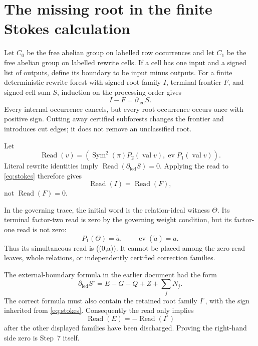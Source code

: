 \documentclass[11pt]{article}
\theoremstyle{definition}
\theoremstyle{remark}
\newcommand{\Sym}{\operatorname{Sym}}
\newcommand{\ev}{\operatorname{ev}}
\begin{document}
\section{The missing root in the finite Stokes calculation}

Let \(C_0\) be the free abelian group on labelled row occurrences and let
\(C_1\) be the free abelian group on labelled rewrite cells.  If a cell has
one input and a signed list of outputs, define its boundary to be input
minus outputs.  For a finite deterministic rewrite forest with signed root
family \(I\), terminal frontier \(F\), and signed cell sum \(S\), induction
on the processing order gives
\begin{equation}
                         I-F=\partial_{\mathrm{led}}S.       \label{eq:stokes}
\end{equation}
Every internal occurrence cancels, but every root occurrence occurs once
with positive sign.  Cutting away certified subforests changes the frontier
and introduces cut edges; it does not remove an unclassified root.

Let
\[
 \operatorname{Read}(v)=
 \left(
  \Sym^2(\pi)P_2(\operatorname{val}v),
  \ev P_1(\operatorname{val}v)
 \right).
\]
Literal rewrite identities imply
\(\operatorname{Read}(\partial_{\mathrm{led}}S)=0\).  Applying the read to
\eqref{eq:stokes} therefore gives
\begin{equation}
                         \operatorname{Read}(I)
                         =\operatorname{Read}(F),            \label{eq:root-frontier}
\end{equation}
not \(\operatorname{Read}(F)=0\).

In the governing trace, the initial word is the relation-ideal witness
\(\Theta\).  Its terminal factor-two read is zero by the governing weight
condition, but its factor-one read is not zero:
\begin{equation}
 P_1(\Theta)=\widetilde a,
 \qquad
 \ev(\widetilde a)=a.                                      \label{eq:root-read}
\end{equation}
Thus its simultaneous read is ((0,a)).  It cannot be placed among the
zero-read leaves, whole relations, or independently certified correction
families.

The external-boundary formula in the earlier document had the form
\[
 \partial_{\mathrm{led}}S^\circ
    =E-G+Q+Z+\sum_jN_j.
\]
The correct formula must also contain the retained root family
\(I^\circ\), with the sign inherited from \eqref{eq:stokes}.  Consequently
the read only implies
\[
 \operatorname{Read}(E)
   =-\operatorname{Read}(I^\circ)
\]
after the other displayed families have been discharged.  Proving the
right-hand side zero is Step~7 itself.
\end{document}
